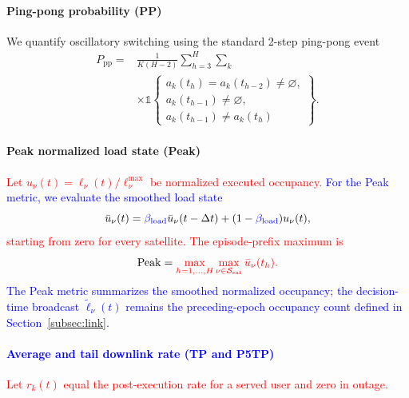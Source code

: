 \documentclass[10pt,letterpaper,journal]{IEEEtran}
\newcommand{\mathbbm}[1]{\mathds{#1}}
\newcommand{\revnew}[1]{\textcolor{red}{#1}}
\begin{document}
\paragraph{Ping-pong probability (PP)}
We quantify oscillatory switching using the standard 2-step ping-pong event
\begingroup
\color{blue}
\begin{equation}
\begin{aligned}
P_{\mathrm{pp}}
={}&\frac{1}{K(H-2)}
\sum_{h=3}^{H}\sum_k\\
&\times\mathbbm{1}\!\left\{
\begin{array}{l}
a_k(t_h)=a_k(t_{h-2})\neq\varnothing,\\
a_k(t_{h-1})\neq\varnothing,\\
a_k(t_{h-1})\neq a_k(t_h)
\end{array}
\right\}.
\end{aligned}
\label{eq:metric_pp}
\end{equation}
\endgroup

\paragraph{Peak normalized load state (Peak)}

\revnew{Let $u_\nu(t)=\ell_\nu(t)/\ell_\nu^{\max}$ be normalized executed occupancy.}
\textcolor{blue}{For the Peak metric, we evaluate the smoothed load state}
\begin{equation}
\bar u_\nu(t)
=
\textcolor{blue}{\beta_{\rm load}}\bar u_\nu(t-\Delta t)
+
(1-\textcolor{blue}{\beta_{\rm load}})u_\nu(t),
\end{equation}
\revnew{starting from zero for every satellite. The episode-prefix maximum is}
\begin{equation}
 \mathrm{Peak}
=
\revnew{\max_{h=1,\ldots,H}\max_{\nu\in\mathcal S_{\rm sat}}
\bar u_\nu(t_h).}   
\end{equation}
\textcolor{blue}{The Peak metric summarizes the smoothed normalized occupancy; the decision-time broadcast $\tilde\ell_\nu(t)$ remains the preceding-epoch occupancy count defined in Section~\ref{subsec:link}.} 


\paragraph{\textcolor{blue}{Average and tail downlink rate (TP and P5TP)}}

\revnew{Let $r_k(t)$ equal the post-execution rate for a served user and zero in outage.}
\end{document}
